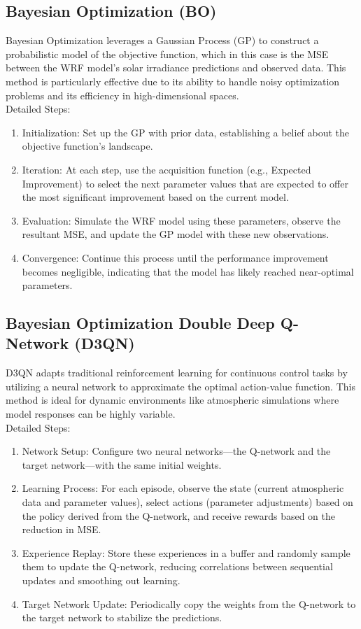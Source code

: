 \documentclass[conference]{IEEEtran}
\begin{document}
\subsection{Bayesian Optimization (BO)}
Bayesian Optimization leverages a Gaussian Process (GP) to construct a probabilistic model of the objective function, which in this case is the MSE between the WRF model’s solar irradiance predictions and observed data. This method is particularly effective due to its ability to handle noisy optimization problems and its efficiency in high-dimensional spaces.
\\
Detailed Steps:
\begin{enumerate}
    \item Initialization: Set up the GP with prior data, establishing a belief about the objective function’s landscape.
    \item Iteration: At each step, use the acquisition function (e.g., Expected Improvement) to select the next parameter values that are expected to offer the most significant improvement based on the current model.
    \item Evaluation: Simulate the WRF model using these parameters, observe the resultant MSE, and update the GP model with these new observations.
    \item Convergence: Continue this process until the performance improvement becomes negligible, indicating that the model has likely reached near-optimal parameters.
\end{enumerate}

\subsection{Bayesian Optimization Double Deep Q-Network (D3QN)}
D3QN adapts traditional reinforcement learning for continuous control tasks by utilizing a neural network to approximate the optimal action-value function. This method is ideal for dynamic environments like atmospheric simulations where model responses can be highly variable.
\\
Detailed Steps:
\begin{enumerate}
    \item Network Setup: Configure two neural networks—the Q-network and the target network—with the same initial weights.
    \item Learning Process: For each episode, observe the state (current atmospheric data and parameter values), select actions (parameter adjustments) based on the policy derived from the Q-network, and receive rewards based on the reduction in MSE.
    \item Experience Replay: Store these experiences in a buffer and randomly sample them to update the Q-network, reducing correlations between sequential updates and smoothing out learning.
    \item Target Network Update: Periodically copy the weights from the Q-network to the target network to stabilize the predictions.
\end{enumerate}
\end{document}
